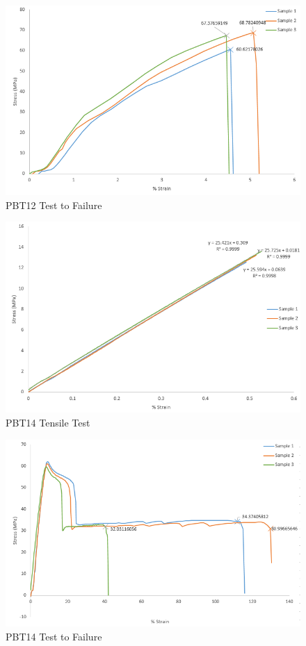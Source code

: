 \documentclass[11pt]{article}
\begin{document}
\begin{appendices}
\begin{figure}[H]
\centering
\includegraphics[width=.95\linewidth]{figures/PBT12_Fail.png}
\caption{PBT12 Test to Failure}
\label{pbt12fail}
\end{figure}

\begin{figure}[H]
\centering
\includegraphics[width=.95\linewidth]{figures/PBT14_Tensile.png}
\caption{PBT14 Tensile Test}
\label{pbt14tensile}
\end{figure}

\begin{figure}[H]
\centering
\includegraphics[width=.95\linewidth]{figures/PBT14_Fail.png}
\caption{PBT14 Test to Failure}
\label{pbt14fail}
\end{figure}

\end{appendices}
\end{document}
